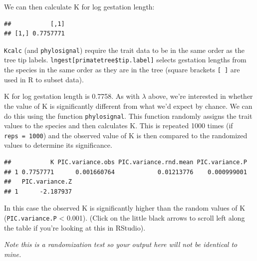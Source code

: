 \documentclass[]{book}
\newenvironment{Shaded}{\begin{snugshade}}{\end{snugshade}}
\newcommand{\KeywordTok}[1]{\textcolor[rgb]{0.13,0.29,0.53}{\textbf{{#1}}}}
\newcommand{\DataTypeTok}[1]{\textcolor[rgb]{0.13,0.29,0.53}{{#1}}}
\newcommand{\DecValTok}[1]{\textcolor[rgb]{0.00,0.00,0.81}{{#1}}}
\newcommand{\NormalTok}[1]{{#1}}
\theoremstyle{definition}
\theoremstyle{definition}
\theoremstyle{definition}
\theoremstyle{remark}
\begin{document}
We can then calculate K for log gestation length:

\begin{Shaded}
\end{Shaded}

\begin{verbatim}
##           [,1]
## [1,] 0.7757771
\end{verbatim}

\texttt{Kcalc} (and \texttt{phylosignal}) require the trait data to be
in the same order as the tree tip labels.
\texttt{lngest{[}primatetree\$tip.label{]}} selects gestation lengths
from the species in the same order as they are in the tree (square
brackets \texttt{{[}\ {]}} are used in R to subset data).

K for log gestation length is 0.7758. As with \(\lambda\) above, we're
interested in whether the value of K is significantly different from
what we'd expect by chance. We can do this using the function
\texttt{phylosignal}. This function randomly assigns the trait values to
the species and then calculates K. This is repeated 1000 times (if
\texttt{reps\ =\ 1000}) and the observed value of K is then compared to
the randomized values to determine its significance.

\begin{Shaded}
\end{Shaded}

\begin{verbatim}
##           K PIC.variance.obs PIC.variance.rnd.mean PIC.variance.P
## 1 0.7757771      0.001660764            0.01213776    0.000999001
##   PIC.variance.Z
## 1      -2.187937
\end{verbatim}

In this case the observed K is significantly higher than the random
values of K (\texttt{PIC.variance.P} \textless{} 0.001). (Click on the
little black arrows to scroll left along the table if you're looking at
this in RStudio).

\emph{Note this is a randomization test so your output here will not be
identical to mine.}
\end{document}
